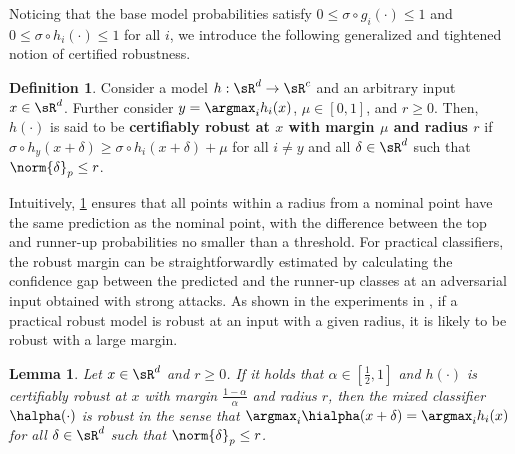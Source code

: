 \documentclass[11pt, letterpaper]{article}
\theoremstyle{plain}
\newtheorem{lemma}{Lemma}
\theoremstyle{definition}
\newtheorem{definition}{Definition}
\begin{document}
Noticing that the base model probabilities satisfy $0 \leq \sigma \circ g_i (\cdot) \leq 1$ and $0 \leq \sigma \circ h_i (\cdot) \leq 1$ for all $i$, we introduce the following generalized and tightened notion of certified robustness.

\begin{definition} \label{def:robust_with_margin}
	Consider a model $h: \sR^d \to \sR^c$ and an arbitrary input $x \in \sR^d$. Further consider $y = \argmax_i h_i (x)$, $\mu \in [0, 1]$, and $r \ge 0$. Then, $h (\cdot)$ is said to be \textbf{certifiably robust at $x$ with margin $\mu$ and radius $r$} if $\sigma \circ h_y (x+\delta) \geq \sigma \circ h_i (x+\delta) + \mu$ for all $i \ne y$ and all $\delta \in \sR^d$ such that $\norm{\delta}_p \leq r$.
\end{definition}

Intuitively, \cref{def:robust_with_margin} ensures that all points within a radius from a nominal point have the same prediction as the nominal point, with the difference between the top and runner-up probabilities no smaller than a threshold. For practical classifiers, the robust margin can be straightforwardly estimated by calculating the confidence gap between the predicted and the runner-up classes at an adversarial input obtained with strong attacks. As shown in the experiments in , if a practical robust model is robust at an input with a given radius, it is likely to be robust with a large margin.

\begin{lemma}
	\label{lem:certified_radius}
	Let $x \in \sR^d$ and $r \ge 0$. If it holds that $\alpha \in [\frac{1}{2}, 1]$ and $h (\cdot)$ is certifiably robust at $x$ with margin $\frac{1-\alpha} {\alpha}$ and radius $r$, then the mixed classifier $\halpha (\cdot)$ is robust in the sense that $\argmax_{i} \hialpha (x+\delta) = \argmax_{i} h_i (x)$ for all $\delta \in \sR^d$ such that $\norm{\delta}_p \leq r$.
\end{lemma}
\end{document}

